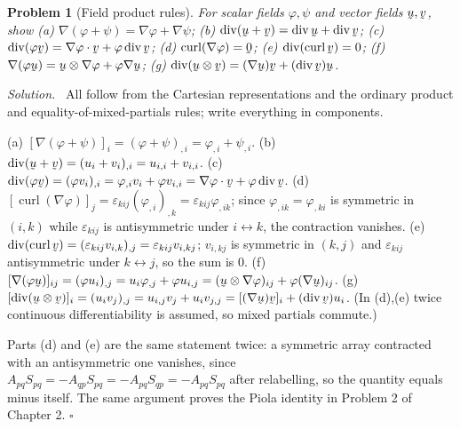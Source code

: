 \documentclass[17pt,a4paper]{extreport}
\DeclareRobustCommand{\vek}[1]{\underaccent{\tilde}{#1}}
\newcommand{\grad}{\nabla}
\newcommand{\dvg}{\operatorname{div}}
\newcommand{\crl}{\operatorname{curl}}
\newcommand{\bu}{\vek{u}}
\newcommand{\bv}{\vek{v}}
\newcommand{\bze}{\vek{0}}
\newcommand{\eps}{\varepsilon}
\newcommand{\ip}[2]{#1\cdot#2}
\theoremstyle{scplain}
\theoremstyle{scdefn}
\theoremstyle{scplain}
\newtheorem{problem}{Problem}
\newenvironment{solution}
 {\par\smallskip\noindent\textit{Solution.}\ }
 {\hfill$\square$\par\medskip}
\begin{document}
\begin{problem}[Field product rules]
For scalar fields $\varphi,\psi$ and vector fields $\bu,\bv$, show
(a) $\grad(\varphi+\psi)=\grad\varphi+\grad\psi$;
(b) $\dvg(\bu+\bv)=\dvg\bu+\dvg\bv$;
(c) $\dvg(\varphi\bv)=\ip{\grad\varphi}\bv+\varphi\dvg\bv$;
(d) $\crl(\grad\varphi)=\bze$;
(e) $\dvg(\crl\bv)=0$;
(f) $\grad(\varphi\bu)=\bu\otimes\grad\varphi+\varphi\grad\bu$;
(g) $\dvg(\bu\otimes\bv)=(\grad\bu)\bv+(\dvg\bv)\bu$.
\end{problem}
\begin{solution}
All follow from the Cartesian representations and the ordinary product and
equality-of-mixed-partials rules; write everything in components.

(a) $[\grad(\varphi+\psi)]_i=(\varphi+\psi)_{,i}=\varphi_{,i}+\psi_{,i}$.
(b) $\dvg(\bu+\bv)=(u_i+v_i)_{,i}=u_{i,i}+v_{i,i}$.
(c) $\dvg(\varphi\bv)=(\varphi v_i)_{,i}=\varphi_{,i}v_i+\varphi v_{i,i}
=\ip{\grad\varphi}\bv+\varphi\dvg\bv$.
(d) $[\crl(\grad\varphi)]_j=\eps_{kij}(\varphi_{,i})_{,k}
=\eps_{kij}\varphi_{,ik}$; since $\varphi_{,ik}=\varphi_{,ki}$ is symmetric
in $(i,k)$ while $\eps_{kij}$ is antisymmetric under $i\leftrightarrow k$,
the contraction vanishes.
(e) $\dvg(\crl\bv)=(\eps_{kij}v_{i,k})_{,j}=\eps_{kij}v_{i,kj}$; $v_{i,kj}$
is symmetric in $(k,j)$ and $\eps_{kij}$ antisymmetric under
$k\leftrightarrow j$, so the sum is $0$.
(f) $[\grad(\varphi\bu)]_{ij}=(\varphi u_i)_{,j}=u_i\varphi_{,j}
+\varphi u_{i,j}=(\bu\otimes\grad\varphi)_{ij}+\varphi(\grad\bu)_{ij}$.
(g) $[\dvg(\bu\otimes\bv)]_i=(u_iv_j)_{,j}=u_{i,j}v_j+u_iv_{j,j}
=[(\grad\bu)\bv]_i+(\dvg\bv)u_i$.
(In (d),(e) twice continuous differentiability is assumed, so mixed
partials commute.)

Parts (d) and (e) are the same statement twice: a symmetric array
contracted with an antisymmetric one vanishes, since
$A_{pq}S_{pq}=-A_{qp}S_{pq}=-A_{pq}S_{qp}=-A_{pq}S_{pq}$ after relabelling,
so the quantity equals minus itself. The same argument proves the Piola
identity in Problem 2 of Chapter 2.
\end{solution}
\end{document}
